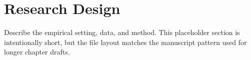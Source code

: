 \section{Research Design}

Describe the empirical setting, data, and method. This placeholder section is intentionally short, but the file layout matches the manuscript pattern used for longer chapter drafts.
